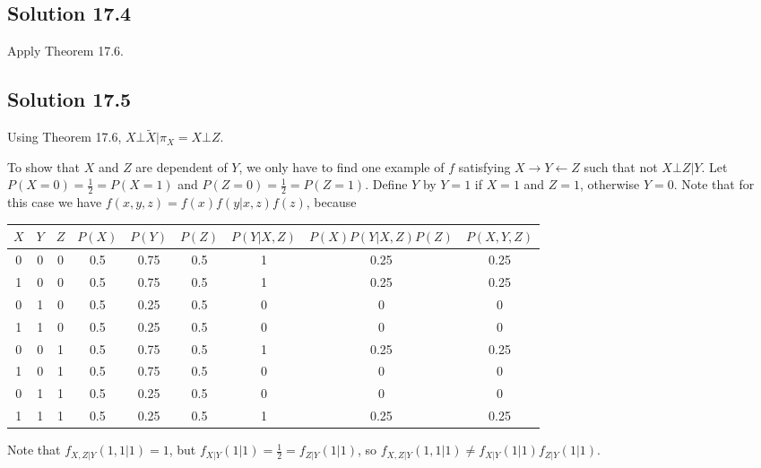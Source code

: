 \subsection*{Solution 17.4}

Apply Theorem 17.6.


\subsection*{Solution 17.5}

Using Theorem 17.6, $X \bot \tilde{X} | \pi_X = X \bot Z$.

To show that $X$ and $Z$ are dependent of $Y$, we only have to find one example of $f$ satisfying $X \rightarrow Y \leftarrow Z$ such that not $X \bot Z | Y$.
Let $P(X = 0) = \frac{1}{2} = P(X = 1)$ and $P(Z = 0) = \frac{1}{2} = P(Z = 1)$.
Define $Y$ by $Y = 1$ if $X = 1$ and $Z = 1$, otherwise $Y = 0$.
Note that for this case we have $f(x, y, z) = f(x) f(y|x,z) f(z)$, because
\begin{table}[H]
    \centering
    \begin{tabular}{c|c|c||c|c|c|c|c|c}
        $X$ & $Y$ & $Z$ & $P(X)$ & $P(Y)$ &  $P(Z)$ & $P(Y|X,Z)$ & $P(X)P(Y|X,Z)P(Z)$ & $P(X,Y,Z)$ \\ \hline \hline
        0   & 0   & 0   & 0.5    & 0.75   &  0.5    & 1          & 0.25               & 0.25       \\ \hline
        1   & 0   & 0   & 0.5    & 0.75   &  0.5    & 1          & 0.25               & 0.25       \\ \hline
        0   & 1   & 0   & 0.5    & 0.25   &  0.5    & 0          & 0                  & 0          \\ \hline
        1   & 1   & 0   & 0.5    & 0.25   &  0.5    & 0          & 0                  & 0          \\ \hline
        0   & 0   & 1   & 0.5    & 0.75   &  0.5    & 1          & 0.25               & 0.25       \\ \hline
        1   & 0   & 1   & 0.5    & 0.75   &  0.5    & 0          & 0                  & 0          \\ \hline
        0   & 1   & 1   & 0.5    & 0.25   &  0.5    & 0          & 0                  & 0          \\ \hline
        1   & 1   & 1   & 0.5    & 0.25   &  0.5    & 1          & 0.25               & 0.25
    \end{tabular}
\end{table}
Note that $f_{X,Z|Y}(1, 1| 1) = 1$, but $f_{X|Y}(1|1) = \frac{1}{2} = f_{Z|Y}(1|1)$, so $f_{X,Z|Y}(1,1|1) \neq f_{X|Y}(1|1)f_{Z|Y}(1|1)$.


